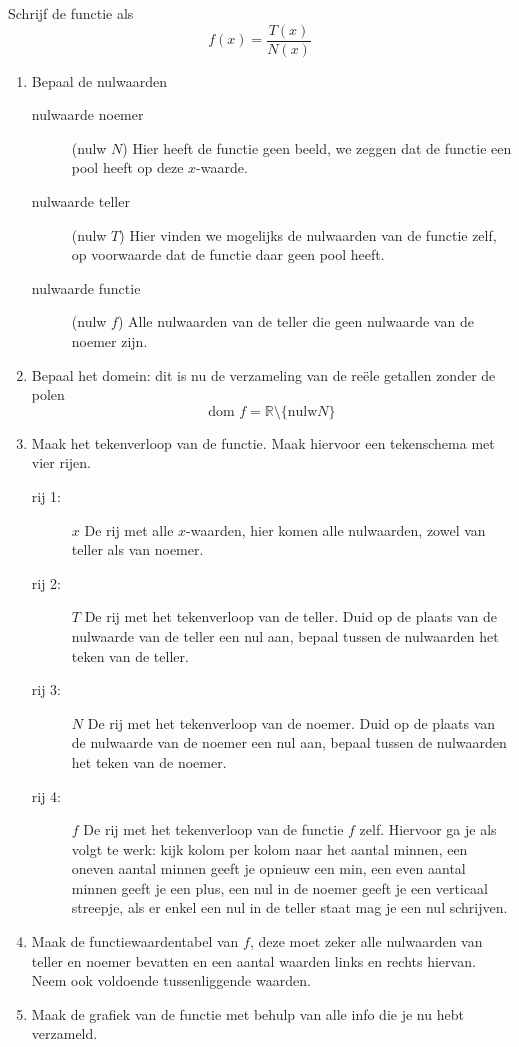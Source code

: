 \documentclass[12pt]{article}
\begin{document}
\begin{theorie}
Schrijf de functie als
$$f(x)=\dfrac{T(x)}{N(x)}$$
\begin{enumerate}
\singlespacing
  \item Bepaal de nulwaarden
  \begin{description}
    \item[nulwaarde noemer] (nulw $N$) Hier heeft de functie geen beeld, we zeggen dat de functie een pool heeft op deze $x$-waarde.
    \item[nulwaarde teller] (nulw $T$) Hier vinden we mogelijks de nulwaarden van de functie zelf, op voorwaarde dat de functie daar geen pool heeft.
    \item[nulwaarde functie] (nulw $f$) Alle nulwaarden van de teller die geen nulwaarde van de noemer zijn.
  \end{description}
  \item Bepaal het domein: dit is nu de verzameling van de reële getallen zonder de polen
  $$\mbox{dom }f = \mathbb{R}\setminus \{\mbox{nulw} N\}$$
  \item Maak het tekenverloop van de functie. Maak hiervoor een tekenschema met vier rijen.
  \begin{description}
    \item[rij 1:] $x$ De rij met alle $x$-waarden, hier komen alle nulwaarden, zowel van teller als van noemer.
    \item[rij 2:] $T$ De rij met het tekenverloop van de teller. Duid op de plaats van de nulwaarde van de teller een nul aan, bepaal tussen de nulwaarden het teken van de teller.
    \item[rij 3:] $N$ De rij met het tekenverloop van de noemer. Duid op de plaats van de nulwaarde van de noemer een nul aan, bepaal tussen de nulwaarden het teken van de noemer.
    \item[rij 4:] $f$ De rij met het tekenverloop van de functie $f$ zelf. Hiervoor ga je als volgt te werk: kijk kolom per kolom naar het aantal minnen, een oneven aantal minnen geeft je opnieuw een min, een even aantal minnen geeft je een plus, een nul in de noemer geeft je een verticaal streepje, als er enkel een nul in de teller staat mag je een nul schrijven.
  \end{description}
  \item Maak de functiewaardentabel van $f$, deze moet zeker alle nulwaarden van teller en noemer bevatten en een aantal waarden links en rechts hiervan. Neem ook voldoende tussenliggende waarden.
  \item Maak de grafiek van de functie met behulp van alle info die je nu hebt verzameld.

\end{enumerate}
\end{theorie}
\end{document}
